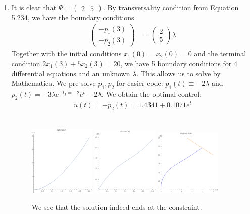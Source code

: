 \documentclass[12pt]{article}
\begin{document}
\begin{problem}[1]
\begin{enumerate}[label=(\alph*)]
\item It is clear that $ \Psi = \begin{pmatrix} 2&5 \end{pmatrix} $. By transversality condition from Equation 5.234, we have the boundary conditions
\begin{align*}
	\begin{pmatrix} -p_1(3)\\-p_2(3) \end{pmatrix} &= \begin{pmatrix} 2\\5 \end{pmatrix} \lambda 
\end{align*}
Together with the initial conditions $ x_1(0)=x_2(0)=0$ and the terminal condition $ 2 x_1(3) + 5x_2(3) = 20$, we have 5 boundary conditions for 4 differential equations and an unknown $ \lambda$. This allows us to solve by Mathematica. We pre-solve $ p_1,p_2$ for easier code: $ p_1(t) \equiv -2 \lambda$ and $ p_2(t) = -3 \lambda e^{-t_f=-2} e^{t} - 2 \lambda$. We obtain the optimal control:
\begin{align*}
	u(t)=-p_2(t)= 1.4341+0.1071 e^{t}
\end{align*}
~\begin{figure}[H]
	\centering
	\includegraphics[width=0.3\textwidth]{./figures/4.12.png}
	\includegraphics[width=0.3\textwidth]{./figures/4.13.png}
	\includegraphics[width=0.3\textwidth]{./figures/4.14.png}
	\caption{We see that the solution indeed ends at the constraint.}
\end{figure}


\end{enumerate}
\end{problem}
\end{document}

